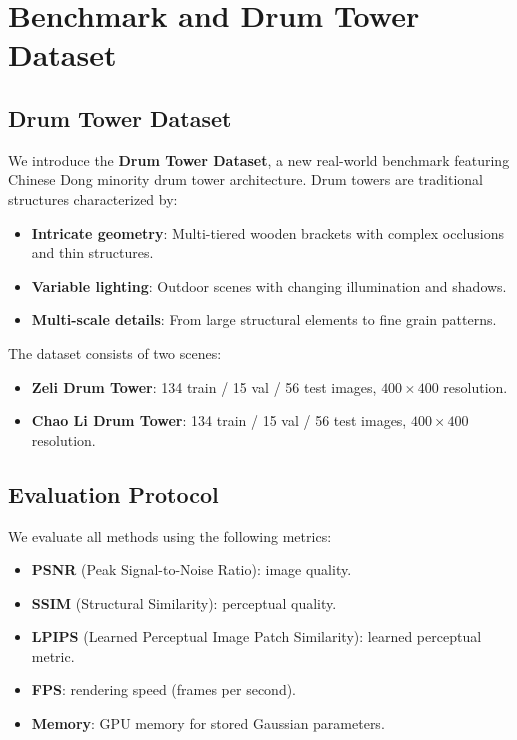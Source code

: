 \section{Benchmark and Drum Tower Dataset}
\label{sec:benchmark}

\subsection{Drum Tower Dataset}
\label{sec:benchmark:dataset}

We introduce the \textbf{Drum Tower Dataset}, a new real-world benchmark
featuring Chinese Dong minority drum tower architecture.
Drum towers are traditional structures characterized by:
\begin{itemize}[leftmargin=*]
    \item \textbf{Intricate geometry}: Multi-tiered wooden brackets
          with complex occlusions and thin structures.
    \item \textbf{Variable lighting}: Outdoor scenes with changing
          illumination and shadows.
    \item \textbf{Multi-scale details}: From large structural elements
          to fine grain patterns.
\end{itemize}

The dataset consists of two scenes:
\begin{itemize}[leftmargin=*]
    \item \textbf{Zeli Drum Tower}: 134 train / 15 val / 56 test images,
          $400\times400$ resolution.
    \item \textbf{Chao Li Drum Tower}: 134 train / 15 val / 56 test images,
          $400\times400$ resolution.
\end{itemize}

\subsection{Evaluation Protocol}
\label{sec:benchmark:protocol}

We evaluate all methods using the following metrics:
\begin{itemize}[leftmargin=*]
    \item \textbf{PSNR} (Peak Signal-to-Noise Ratio): image quality.
    \item \textbf{SSIM} (Structural Similarity): perceptual quality.
    \item \textbf{LPIPS} (Learned Perceptual Image Patch Similarity):
          learned perceptual metric.
    \item \textbf{FPS}: rendering speed (frames per second).
    \item \textbf{Memory}: GPU memory for stored Gaussian parameters.
\end{itemize}

